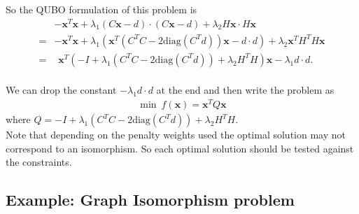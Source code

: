 \documentclass{article}
\begin{document}
\noindent So the QUBO formulation of this problem is 
\begin{align*}
    &-\mathbf{x}^T \mathbf{x} + \lambda_1(C\mathbf{x} - d)\cdot (C\mathbf{x} - d)  +\lambda_2 H\mathbf{x} \cdot H\mathbf{x}\\
    = &-\mathbf{x}^T \mathbf{x} + \lambda_1(\mathbf{x}^T( C^T C -2\text{diag}(C^T d))\mathbf{x} - d\cdot d) + \lambda_2 \mathbf{x}^T H^T H \mathbf{x}\\
    = &\hspace{5pt} \mathbf{x}^T (-I + \lambda_1( C^T C -2\text{diag}(C^T d)) + 
    \lambda_2 H^T H) \mathbf{x} - \lambda_1 d \cdot d.
\end{align*}\\
We can drop the constant \(- \lambda_1 d \cdot d\) at the end and then write the problem as
\begin{align*}
    \min \: f(\mathbf{x}) = \mathbf{x}^T Q \mathbf{x}
\end{align*}
where \(Q = -I + \lambda_1( C^T C -2\text{diag}(C^T d)) + \lambda_2 H^T H\).\\

\noindent Note that depending on the penalty weights used the optimal solution may not correspond to an isomorphism. So each optimal solution should be tested against the constraints.

\subsection{Example: Graph Isomorphism problem}






\nocite{*}
\printbibliography %
\end{document}
